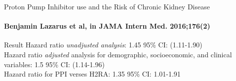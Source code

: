\documentclass{beamer}
\begin{document}
\begin{frame}{Proton Pump Inhibitor use and the Risk of Chronic Kidney Disease }
\framesubtitle{Benjamin Lazarus et al, in JAMA Intern Med. 2016;176(2)  }
\begin{block}{Result}
    { Hazard ratio {\textit{unadjusted analysis}}:} 1.45 95\% CI: (1.11-1.90)\\[0.2cm]
    { Hazard ratio \textit{adjusted} analysis for demographic, socioeconomic, and clinical variables:} 1.5 95\% CI: (1.14-1.96)\\[0.2cm]
    { Hazard ratio for PPI verses H2RA:} 1.35 95\% CI: 1.01-1.91
\end{block}
\end{frame}
\end{document}
